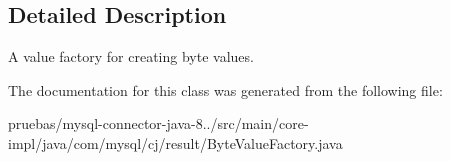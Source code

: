 \subsection{Detailed Description}
A value factory for creating byte values. 

The documentation for this class was generated from the following file\+:\begin{DoxyCompactItemize}
\item 
pruebas/mysql-\/connector-\/java-\/8../src/main/core-\/impl/java/com/mysql/cj/result/Byte\+Value\+Factory.\+java\end{DoxyCompactItemize}

